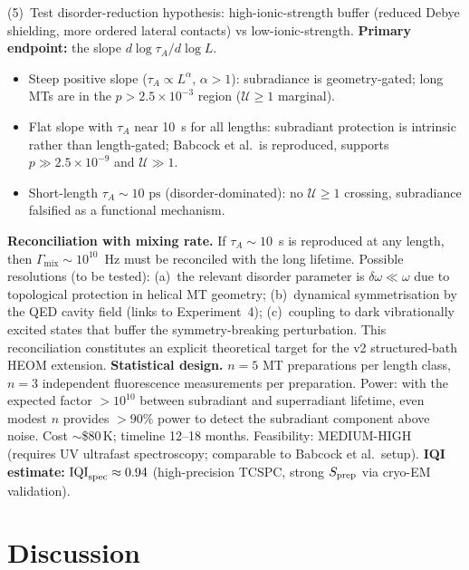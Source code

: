 \documentclass[twocolumn,10pt]{article}
\newcommand{\ps}{\text{~ps}}
\begin{document}
(5)~Test disorder-reduction hypothesis: high-ionic-strength buffer
(reduced Debye shielding, more ordered lateral contacts)
vs low-ionic-strength.
\textbf{Primary endpoint:} the slope $d\log\tau_A / d\log L$.
\begin{itemize}
\item Steep positive slope ($\tau_A \propto L^\alpha$, $\alpha > 1$):
subradiance is geometry-gated; long MTs are in the
$p > 2.5\times 10^{-3}$ region ($\mathcal{U} \ge 1$ marginal).
\item Flat slope with $\tau_A$ near 10~s for all lengths:
subradiant protection is intrinsic rather than length-gated;
Babcock et al.\ is reproduced, supports
$p \gg 2.5\times 10^{-9}$ and $\mathcal{U} \gg 1$.
\item Short-length $\tau_A \sim 10\ps$ (disorder-dominated):
no $\mathcal{U} \ge 1$ crossing, subradiance falsified as
a functional mechanism.
\end{itemize}
\textbf{Reconciliation with mixing rate.} If $\tau_A \sim 10$~s is
reproduced at any length, then $\Gamma_{\text{mix}} \sim 10^{10}$~Hz must
be reconciled with the long lifetime. Possible resolutions (to be tested):
(a)~the relevant disorder parameter is $\delta\omega \ll \omega$ due to
topological protection in helical MT geometry; (b)~dynamical symmetrisation
by the QED cavity field (links to Experiment~4); (c)~coupling to dark
vibrationally excited states that buffer the symmetry-breaking perturbation.
This reconciliation constitutes an explicit theoretical target for the
v2 structured-bath HEOM extension.
\textbf{Statistical design.} $n = 5$ MT preparations per length class,
$n = 3$ independent fluorescence measurements per preparation.
Power: with the expected factor $>10^{10}$ between subradiant and
superradiant lifetime, even modest $n$ provides $>90\%$ power to
detect the subradiant component above noise.
Cost $\sim$\$80\,K; timeline 12--18 months.
Feasibility: MEDIUM-HIGH (requires UV ultrafast spectroscopy; comparable
to Babcock et al.\ setup).
\textbf{IQI estimate:} $\text{IQI}_{\rm spec} \approx 0.94$ (high-precision TCSPC, strong $S_{\rm prep}$ via cryo-EM validation).

\section{Discussion}
\end{document}
